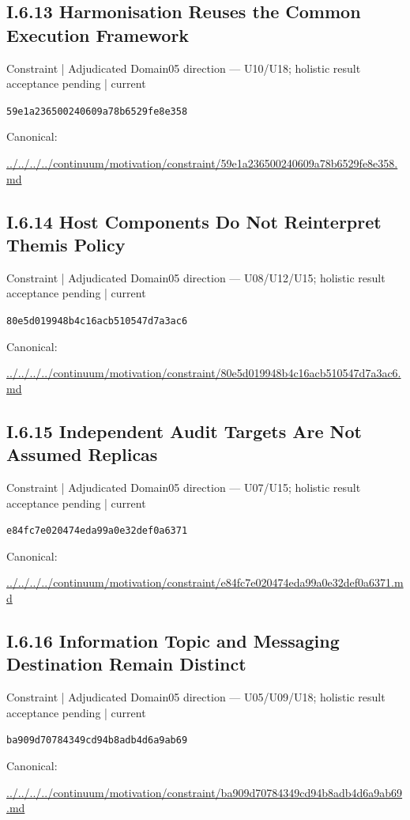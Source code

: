 \documentclass[10pt,a4paper]{article}
\begin{document}
\subsection*{I.6.13 Harmonisation Reuses the Common Execution Framework}
\label{element-59e1a236500240609a78b6529fe8e358}
{\small Constraint | Adjudicated Domain05 direction — U10/U18; holistic result acceptance pending | current}\par
\texttt{59e1a236500240609a78b6529fe8e358}\par
Canonical: \par
{\footnotesize\url{../../../../continuum/motivation/constraint/59e1a236500240609a78b6529fe8e358.md}}\par
\subsection*{I.6.14 Host Components Do Not Reinterpret Themis Policy}
\label{element-80e5d019948b4c16acb510547d7a3ac6}
{\small Constraint | Adjudicated Domain05 direction — U08/U12/U15; holistic result acceptance pending | current}\par
\texttt{80e5d019948b4c16acb510547d7a3ac6}\par
Canonical: \par
{\footnotesize\url{../../../../continuum/motivation/constraint/80e5d019948b4c16acb510547d7a3ac6.md}}\par
\subsection*{I.6.15 Independent Audit Targets Are Not Assumed Replicas}
\label{element-e84fc7e020474eda99a0e32def0a6371}
{\small Constraint | Adjudicated Domain05 direction — U07/U15; holistic result acceptance pending | current}\par
\texttt{e84fc7e020474eda99a0e32def0a6371}\par
Canonical: \par
{\footnotesize\url{../../../../continuum/motivation/constraint/e84fc7e020474eda99a0e32def0a6371.md}}\par
\subsection*{I.6.16 Information Topic and Messaging Destination Remain Distinct}
\label{element-ba909d70784349cd94b8adb4d6a9ab69}
{\small Constraint | Adjudicated Domain05 direction — U05/U09/U18; holistic result acceptance pending | current}\par
\texttt{ba909d70784349cd94b8adb4d6a9ab69}\par
Canonical: \par
{\footnotesize\url{../../../../continuum/motivation/constraint/ba909d70784349cd94b8adb4d6a9ab69.md}}\par
\end{document}
